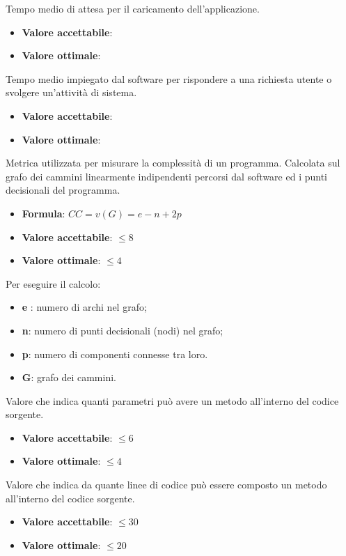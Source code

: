Tempo medio di attesa per il caricamento dell'applicazione.
\begin{itemize}
    \item \textbf{Valore accettabile}:
    \item \textbf{Valore ottimale}:
\end{itemize} 

Tempo medio impiegato dal software per rispondere a una richiesta utente o svolgere un’attività di sistema. 
\begin{itemize}
    \item \textbf{Valore accettabile}:
    \item \textbf{Valore ottimale}:
\end{itemize}  

Metrica utilizzata per misurare la complessità di un programma. Calcolata sul grafo dei cammini linearmente indipendenti percorsi dal software ed i punti decisionali del programma.
\begin{itemize}
    \item \textbf{Formula}: $CC=v(G)=e-n+2p$
    \item \textbf{Valore accettabile}: $\leq8$
    \item \textbf{Valore ottimale}: $\leq4$
\end{itemize}  
Per eseguire il calcolo:
\begin{itemize}
    \item \textbf{e} : numero di archi nel grafo;
    \item \textbf{n}: numero di punti decisionali (nodi) nel grafo;
    \item \textbf{p}: numero di componenti connesse tra loro.
    \item \textbf{G}: grafo dei cammini.
\end{itemize}

Valore che indica quanti parametri può avere un metodo all'interno del codice sorgente.
\begin{itemize}
    \item \textbf{Valore accettabile}: $\leq6$
    \item \textbf{Valore ottimale}: $\leq4$
\end{itemize} 

Valore che indica da quante linee di codice può essere composto un metodo all'interno del codice sorgente.
\begin{itemize}
    \item \textbf{Valore accettabile}: $\leq30$
    \item \textbf{Valore ottimale}: $\leq20$
\end{itemize} 

